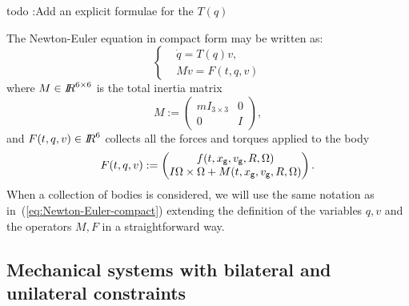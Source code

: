 \begin{ndrva}
{ todo :Add an explicit formulae for the $T(q)$}
\end{ndrva}
%
The Newton-Euler equation in compact form may be written as:
\begin{equation}
\label{eq:Newton-Euler-compact}
 \left \{ 
 \begin{aligned}
  &\dot q=T(q)v, \\
  & M \dot v = F(t, q, v)
 \end{aligned}
 \right.
\end{equation}
where $M\in\mbox{\rm $I\!\!R$}^{6\times6}$ is the total inertia matrix
\begin{equation}
  M:= \begin{pmatrix}
    m I_{3\times 3} & 0 \\
    0 & I 
  \end{pmatrix},
\end{equation}
and $F(t, q, v)\in \mbox{\rm $I\!\!R$}^6$ collects all the forces and torques applied to the body
\begin{equation}
  F(t,q,v):= \begin{pmatrix}
    f(t,x_{\sf \small g},  v_{\sf \small g}, R, \Omega ) \\
    I \Omega \times \Omega + M(t,x_{\sf \small g}, v_{\sf \small g}, R, \Omega )
  \end{pmatrix}.
\end{equation}
When a collection of bodies is considered, we will use the same notation as in~(\ref{eq:Newton-Euler-compact}) extending the definition of the variables $q,v$ and the operators $M,F$ in a straightforward way.

\subsection{Mechanical systems  with bilateral and unilateral constraints}
\label{section22}




